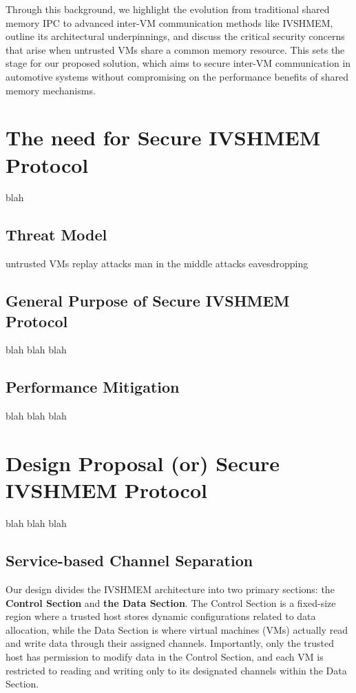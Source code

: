 \documentclass[letterpaper,twocolumn,10pt]{article}
\begin{document}
Through this background, we highlight the evolution from traditional shared memory IPC to advanced inter-VM communication methods like IVSHMEM, outline its architectural underpinnings, and discuss the critical security concerns that arise when untrusted VMs share a common memory resource. This sets the stage for our proposed solution, which aims to secure inter-VM communication in automotive systems without compromising on the performance benefits of shared memory mechanisms.




\section{The need for Secure IVSHMEM Protocol}

blah

\subsection{Threat Model}


untrusted VMs
replay attacks
man in the middle attacks
eavesdropping



\subsection{General Purpose of Secure IVSHMEM Protocol}

blah blah blah

\subsection{Performance Mitigation}

blah blah blah



\section{Design Proposal (or) Secure IVSHMEM Protocol}

blah blah blah




\subsection{Service-based Channel Separation}

Our design divides the IVSHMEM architecture into two primary sections: the \textbf{Control Section} and \textbf{the Data Section}. The Control Section is a fixed-size region where a trusted host stores dynamic configurations related to data allocation, while the Data Section is where virtual machines (VMs) actually read and write data through their assigned channels. Importantly, only the trusted host has permission to modify data in the Control Section, and each VM is restricted to reading and writing only to its designated channels within the Data Section.
\end{document}
